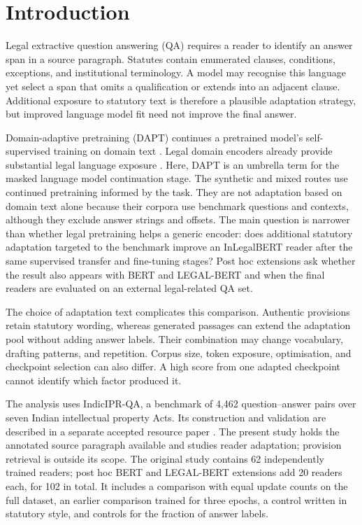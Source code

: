 \documentclass[pdflatex,sn-basic]{sn-jnl}
\begin{document}
\section{Introduction}\label{sec:intro}

Legal extractive question answering (QA) requires a reader to identify an
answer span in a source paragraph. Statutes contain enumerated clauses,
conditions, exceptions, and institutional terminology. A model may recognise
this language yet select a span that omits a qualification or extends into
an adjacent clause. Additional exposure to statutory text is therefore a
plausible adaptation strategy, but improved language model fit need not
improve the final answer.

Domain-adaptive pretraining (DAPT) continues a pretrained model's
self-supervised training on domain text
\citep{gururanganDontStopPretraining2020}. Legal domain encoders already
provide substantial legal language exposure
\citep{chalkidisLEGALBERTMuppetsStraight2020,paul2023pre}.
Here, DAPT is an umbrella term for the masked language model continuation stage.
The synthetic and mixed routes use continued pretraining informed by the task.
They are not adaptation based on domain text alone because their corpora use
benchmark questions and contexts, although they exclude answer strings and
offsets.
The main question is narrower than whether legal pretraining helps a generic
encoder: does additional statutory adaptation targeted to the benchmark improve
an InLegalBERT reader after the same supervised transfer and fine-tuning stages?
Post hoc extensions ask whether the result also appears with BERT and
LEGAL-BERT and when the final readers are evaluated on an external legal-related
QA set.

The choice of adaptation text complicates this comparison. Authentic
provisions retain statutory wording, whereas generated passages can extend
the adaptation pool without adding answer labels. Their combination may
change vocabulary, drafting patterns, and repetition. Corpus size, token
exposure, optimisation, and checkpoint selection can also differ. A high
score from one adapted checkpoint cannot identify which factor produced it.

The analysis uses IndicIPR-QA, a benchmark of 4,462 question--answer
pairs over seven Indian intellectual property Acts. Its construction and
validation are described in a separate accepted resource paper
\citep{anonymous2026indiciprbenchmark}. The present study holds the annotated
source paragraph available and studies reader adaptation; provision retrieval
is outside its scope. The original study contains 62 independently trained readers;
post hoc BERT and LEGAL-BERT extensions add 20 readers each, for 102 in total.
It includes a comparison with equal update counts on the full dataset, an
earlier comparison trained for three epochs, a control written in statutory
style, and controls for the fraction of answer labels.
\end{document}

